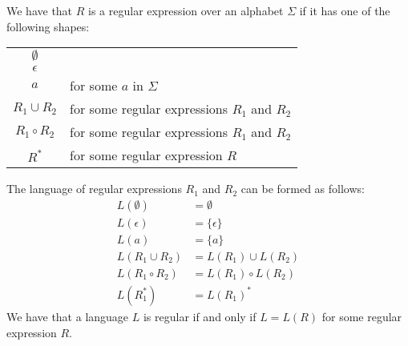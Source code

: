 We have that $R$ is a regular expression over an alphabet
$\Sigma$ if it has one of the following shapes:
\begin{center}
    \begin{tabular}{ c l }
        $\emptyset$ & \\
        $\epsilon$ & \\
        $a$ & for some $a$ in $\Sigma$ \\
        $R_1 \cup R_2$ & for some regular expressions $R_1$ and $R_2$ \\
        $R_1 \circ R_2$ & for some regular expressions $R_1$ and $R_2$ \\
        $R^*$ & for some regular expression $R$ \\
    \end{tabular}
\end{center} The language of regular expressions $R_1$ and $R_2$
can be formed as follows: \begin{align*}
    L(\emptyset) &= \emptyset \\
    L(\epsilon) &= \{\epsilon\} \\
    L(a) &= \{a\} \\
    L(R_1 \cup R_2) &= L(R_1) \cup L(R_2) \\
    L(R_1 \circ R_2) &= L(R_1) \circ L(R_2) \\
    L(R_1^*) &= L(R_1)^*
\end{align*} We have that a language $L$ is regular
if and only if $L = L(R)$ for some regular expression $R$.